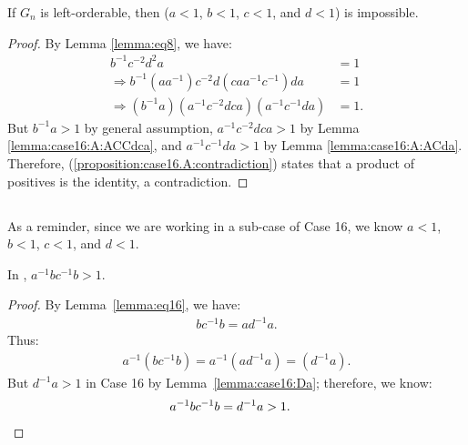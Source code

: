 \begin{proposition}  If $G_n$ is left-orderable, then  ($a<1$, $b<1$, $c<1$, and $d<1$) is impossible.
\label{proposition:case16.A}
\end{proposition}
\begin{proof} By Lemma \ref{lemma:eq8}, we have:
\begin{align}
b^{-1}c^{-2}d^{2}a&=1\nonumber{}\\
\Rightarrow{}b^{-1}(aa^{-1})c^{-2}d(caa^{-1}c^{-1})da&=1\nonumber{}\\
\Rightarrow{}(b^{-1}a)(a^{-1}c^{-2}dca)(a^{-1}c^{-1}da)&=1.
\label{proposition:case16.A:contradiction}
\end{align}
But $b^{-1}a>1$ by general assumption, $a^{-1}c^{-2}dca>1$ by Lemma \ref{lemma:case16:A:ACCdca}, and $a^{-1}c^{-1}da>1$ by Lemma \ref{lemma:case16:A:ACda}. Therefore, (\ref{proposition:case16.A:contradiction}) states that a product of positives is the identity, a contradiction.
\end{proof}

\subsection{}

\noindent{} As a reminder, since we are working in a sub-case of Case 16, we know $a<1$, $b<1$, $c<1$, and $d<1$.

\begin{lemma} In , $a^{-1}bc^{-1}b>1$.
\label{lemma:case16:AbCb}
\end{lemma}
\begin{proof}By Lemma~\ref{lemma:eq16}, we have:
\begin{align*}
bc^{-1}b=ad^{-1}a.
\end{align*}
Thus:
\begin{align*}
a^{-1}(bc^{-1}b)=a^{-1}(ad^{-1}a)=(d^{-1}a).
\end{align*}
But $d^{-1}a>1$ in Case 16 by Lemma~\ref{lemma:case16:Da}; therefore, we know:
\begin{align*}
a^{-1}bc^{-1}b=d^{-1}a&>1.\qedhere
\end{align*}
\end{proof}

